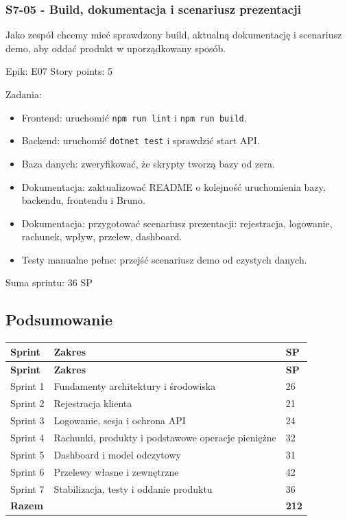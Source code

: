 \documentclass[12pt,a4paper]{article}
\begin{document}
\subsubsection*{S7-05 - Build, dokumentacja i scenariusz prezentacji}

Jako zespół chcemy mieć sprawdzony build, aktualną dokumentację i scenariusz demo, aby oddać produkt w uporządkowany sposób.

Epik: E07
Story points: 5

Zadania:

\begin{itemize}
\item Frontend: uruchomić \texttt{npm run lint} i \texttt{npm run build}.
\item Backend: uruchomić \texttt{dotnet test} i sprawdzić start API.
\item Baza danych: zweryfikować, że skrypty tworzą bazy od zera.
\item Dokumentacja: zaktualizować README o kolejność uruchomienia bazy, backendu, frontendu i Bruno.
\item Dokumentacja: przygotować scenariusz prezentacji: rejestracja, logowanie, rachunek, wpływ, przelew, dashboard.
\item Testy manualne pełne: przejść scenariusz demo od czystych danych.
\end{itemize}

Suma sprintu: 36 SP

\subsection*{Podsumowanie}

\begingroup
\footnotesize
{}
\begin{longtable}{@{}L{0.18\textwidth}L{0.65\textwidth}C{0.08\textwidth}@{}}
\toprule
{}
\textbf{Sprint} & \textbf{Zakres} & \textbf{SP} \\
\midrule
\endfirsthead
\toprule
{}
\textbf{Sprint} & \textbf{Zakres} & \textbf{SP} \\
\midrule
\endhead
Sprint 1 & Fundamenty architektury i środowiska & 26 \\
Sprint 2 & Rejestracja klienta & 21 \\
Sprint 3 & Logowanie, sesja i ochrona API & 24 \\
Sprint 4 & Rachunki, produkty i podstawowe operacje pieniężne & 32 \\
Sprint 5 & Dashboard i model odczytowy & 31 \\
Sprint 6 & Przelewy własne i zewnętrzne & 42 \\
Sprint 7 & Stabilizacja, testy i oddanie produktu & 36 \\
\textbf{Razem} &  & \textbf{212} \\
\bottomrule
\end{longtable}
\endgroup
\end{document}
